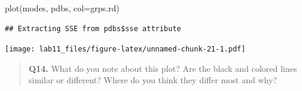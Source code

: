 \documentclass[
]{article}
\newenvironment{Shaded}{\begin{snugshade}}{\end{snugshade}}
\newcommand{\AttributeTok}[1]{\textcolor[rgb]{0.77,0.63,0.00}{#1}}
\newcommand{\FunctionTok}[1]{\textcolor[rgb]{0.00,0.00,0.00}{#1}}
\newcommand{\NormalTok}[1]{#1}
\begin{document}
\begin{Shaded}
\begin{Highlighting}[]
\FunctionTok{plot}\NormalTok{(modes, pdbs, }\AttributeTok{col=}\NormalTok{grps.rd)}
\end{Highlighting}
\end{Shaded}

\begin{verbatim}
## Extracting SSE from pdbs$sse attribute
\end{verbatim}

\texttt{[image: lab11\_files/figure-latex/unnamed-chunk-21-1.pdf]}

\begin{quote}
\textbf{Q14.} What do you note about this plot? Are the black and
colored lines similar or different? Where do you think they differ most
and why?
\end{quote}
\end{document}

